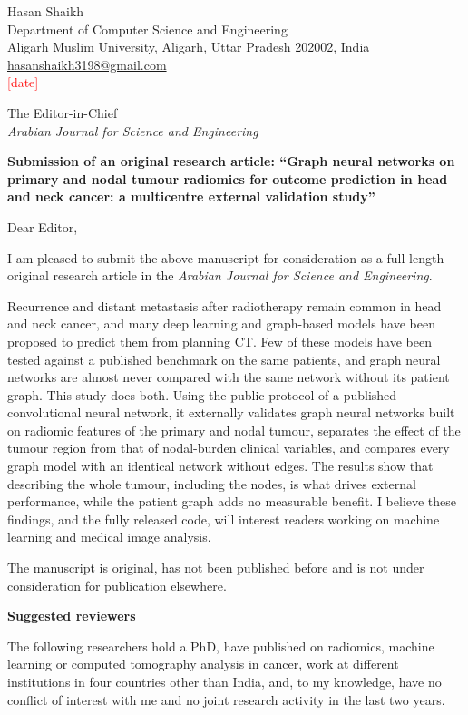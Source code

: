 \documentclass[11pt,a4paper]{article}
\newcommand{\todo}[1]{\textcolor{red}{[#1]}}
\begin{document}
\begin{flushright}
Hasan Shaikh\\
Department of Computer Science and Engineering\\
Aligarh Muslim University, Aligarh, Uttar Pradesh 202002, India\\
\href{mailto:hasanshaikh3198@gmail.com}{hasanshaikh3198@gmail.com}\\[4pt]
\todo{date}
\end{flushright}

The Editor-in-Chief\\
\emph{Arabian Journal for Science and Engineering}

\textbf{Submission of an original research article: ``Graph neural networks on primary and nodal tumour radiomics for outcome prediction in head and neck cancer: a multicentre external validation study''}

Dear Editor,

I am pleased to submit the above manuscript for consideration as a full-length original research article in the \emph{Arabian Journal for Science and Engineering}.

Recurrence and distant metastasis after radiotherapy remain common in head and neck cancer, and many deep learning and graph-based models have been proposed to predict them from planning CT. Few of these models have been tested against a published benchmark on the same patients, and graph neural networks are almost never compared with the same network without its patient graph. This study does both. Using the public protocol of a published convolutional neural network, it externally validates graph neural networks built on radiomic features of the primary and nodal tumour, separates the effect of the tumour region from that of nodal-burden clinical variables, and compares every graph model with an identical network without edges. The results show that describing the whole tumour, including the nodes, is what drives external performance, while the patient graph adds no measurable benefit. I believe these findings, and the fully released code, will interest readers working on machine learning and medical image analysis.

The manuscript is original, has not been published before and is not under consideration for publication elsewhere.

\textbf{Suggested reviewers}

The following researchers hold a PhD, have published on radiomics, machine learning or computed tomography analysis in cancer, work at different institutions in four countries other than India, and, to my knowledge, have no conflict of interest with me and no joint research activity in the last two years.
\end{document}
